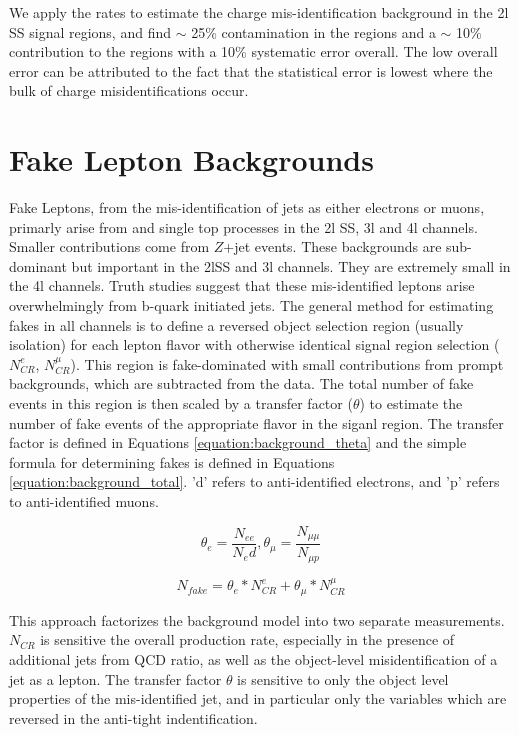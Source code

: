 We apply the rates to estimate the charge mis-identification background in the 2l SS signal regions, and find  $\sim$ 25\% contamination in the \ee regions and a $\sim$ 10\% contribution to the \emu regions with a 10\% systematic error overall. The low overall error can be attributed to the fact that the statistical error is lowest where the bulk of charge misidentifications occur.  


\section{Fake Lepton Backgrounds}

Fake Leptons, from the mis-identification of jets as either electrons or muons, primarly arise from \ttbar and single top processes in the 2l SS, 3l and 4l channels. Smaller contributions come from $Z$+jet events. These backgrounds are sub-dominant but important in the 2lSS and 3l channels. They are extremely small in the 4l channels. Truth studies suggest that these mis-identified leptons arise overwhelmingly from b-quark initiated jets. The general method for estimating fakes in all channels is to define a reversed object selection region (usually isolation) for each lepton flavor with otherwise identical signal region selection ($N^e_{CR}$, $N^{\mu}_{CR}$). This region is fake-dominated with small contributions from prompt backgrounds, which are subtracted from the data. The total number of fake events in this region is then scaled by a transfer factor ($\theta$) to estimate the number of fake events of the appropriate flavor in the siganl region. The transfer factor is defined in Equations \ref{equation:background_theta} and the simple formula for determining fakes is defined in Equations \ref{equation:background_total}.  'd' refers to anti-identified electrons, and 'p' refers to anti-identified muons.  


\begin{equation}
\theta_e = \frac{N_{ee}}{N_ed}, \theta_{\mu} = \frac{N_{\mu\mu}}{N_{\mu p}}
\label{equation:background_theta}
\end{equation}

\begin{equation}
N_{fake} = \theta_e * N^e_{CR} + \theta_{\mu} * N^{\mu}_{CR}   
\label{equation:background_total}
\end{equation}


This approach factorizes the background model into two separate measurements. $N_{CR}$ is sensitive the overall \ttbar production rate, especially in the presence of additional jets from QCD ratio, as well as the object-level misidentification of a jet as a lepton. The transfer factor $\theta$ is sensitive to only the object level properties of the mis-identified jet, and in particular only the variables which are reversed in the anti-tight indentification. 

